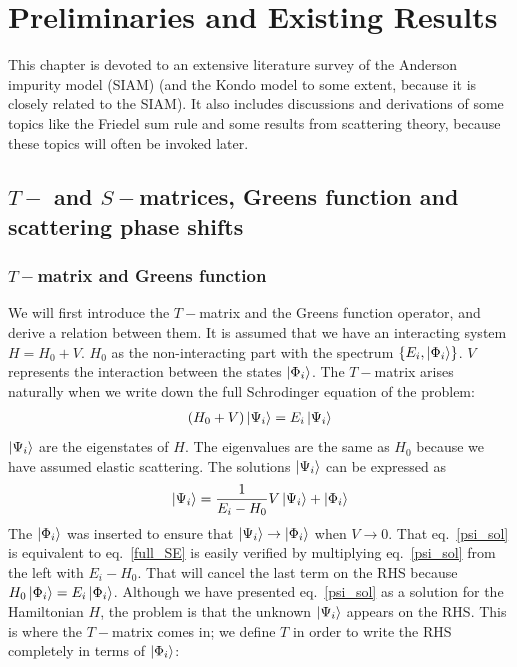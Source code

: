 \chapter{Preliminaries and Existing Results}\label{prelims}
This chapter is devoted to an extensive literature survey of the Anderson impurity model (SIAM) (and the Kondo model to some extent, because it is closely related to the SIAM). It also includes discussions and derivations of some topics like the Friedel sum rule and some results from scattering theory, because these topics will often be invoked later.

\section{\(T-\) and \(S-\)matrices, Greens function and scattering phase shifts}
\subsection{\(T-\)matrix and Greens function}
We will first introduce the \(T-\)matrix and the Greens function operator, and derive a relation between them. It is assumed that we have an interacting system \(H = H_0 + V\). \(H_0\) as the non-interacting part with the spectrum \(\left\{E_i, \ket{\Phi_i}\right\}\). \(V\) represents the interaction between the states \(\ket{\Phi_i}\). The \(T-\)matrix arises naturally when we write down the full Schrodinger equation of the problem:
\begin{equation}\begin{aligned}
	\label{full_SE}
	\left(H_0 + V\right) \ket{\Psi_i} = E_i \ket{\Psi_i}
\end{aligned}\end{equation}
\(\ket{\Psi_i}\) are the eigenstates of \(H\). The eigenvalues are the same as \(H_0\) because we have assumed elastic scattering. The solutions \(\ket{\Psi_i}\) can be expressed as
\begin{equation}\begin{aligned}
	\label{psi_sol}
	\ket{\Psi_i} = \frac{1}{E_i - H_0}V\ket{\Psi_i} + \ket{\Phi_i}
\end{aligned}\end{equation}
The \(\ket{\Phi_i}\) was inserted  to ensure that \(\ket{\Psi_i} \to \ket{\Phi_i}\) when \(V \to 0\). That eq.~\ref{psi_sol} is equivalent to eq.~\ref{full_SE} is easily verified by multiplying eq.~\ref{psi_sol} from the left with \(E_i - H_0\). That will cancel the last term on the RHS because \(H_0 \ket{\Phi_i} = E_i \ket{\Phi_i}\). Although we have presented eq.~\ref{psi_sol} as a solution for the Hamiltonian \(H\), the problem is that the unknown \(\ket{\Psi_i}\) appears on the RHS. This is where the \(T-\)matrix comes in; we define \(T\) in order to write the RHS completely in terms of \(\ket{\Phi_i}\):
